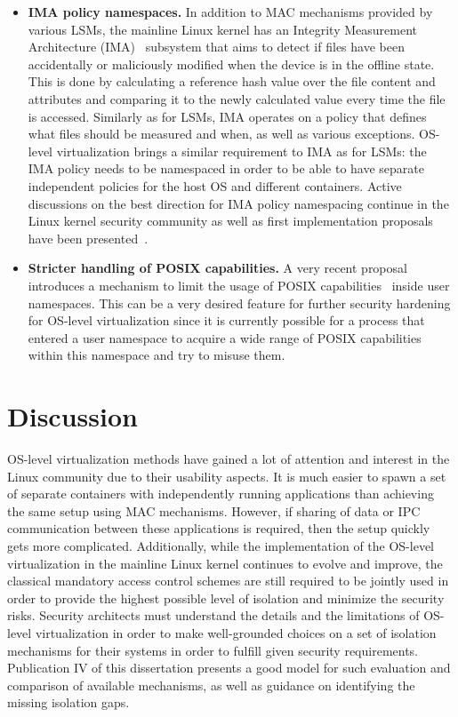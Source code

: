 \begin{itemize}
	\item \textbf{IMA policy namespaces.} In addition to MAC mechanisms provided by various LSMs, the mainline Linux kernel has an Integrity Measurement Architecture (IMA)~\cite{ima} subsystem that aims to detect if files have been accidentally or maliciously modified when the device is in the offline state. This is done by calculating a reference hash value over the file content and attributes and comparing it to the newly calculated value every time the file is accessed. Similarly as for LSMs, IMA operates on a policy that defines what files should be measured and when, as well as various exceptions. OS-level virtualization brings a similar requirement to IMA as for LSMs: the IMA policy needs to be namespaced in order to be able to have separate independent policies for the host OS and different containers. Active discussions on the best direction for IMA policy namespacing continue in the Linux kernel security community as well as first implementation proposals have been presented~\cite{magalhaes2017}. 
	\item \textbf{Stricter handling of POSIX capabilities.} A very recent proposal~\cite{Bandewar2017} introduces a mechanism to limit the usage of POSIX capabilities~\cite{caps} inside user namespaces. This can be a very desired feature for further security hardening for OS-level virtualization since it is currently possible for a process that entered a user namespace to acquire a wide range of POSIX capabilities within this namespace and try to misuse them. 
\end{itemize}


\section{Discussion}

OS-level virtualization methods have gained a lot of attention and interest in the Linux community due to their usability aspects. It is much easier to spawn a set of separate containers with independently running applications than achieving the same setup using MAC mechanisms. However, if sharing of data or IPC communication between these applications is required, then the setup quickly gets more complicated. Additionally, while the implementation of the OS-level virtualization in the mainline Linux kernel continues to evolve and improve, the classical mandatory access control schemes are still required to be jointly used in order to provide the highest possible level of isolation and minimize the security risks. Security architects must understand the details and the limitations of OS-level virtualization in order to make well-grounded choices on a set of isolation mechanisms for their systems in order to fulfill given security requirements. Publication IV of this dissertation presents a good model for such evaluation and comparison of available mechanisms, as well as guidance on identifying the missing isolation gaps. 

